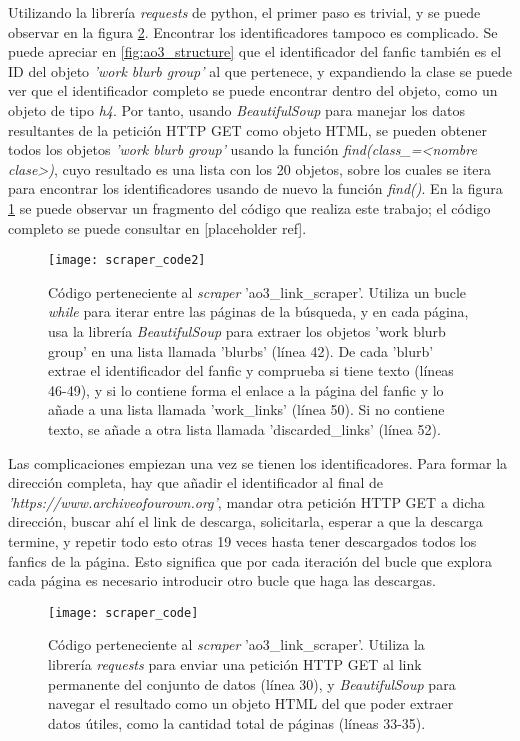 \documentclass{pre-tfg}
\newcommand{\refToLinkScraperCode}{[placeholder ref]}
\begin{document}
Utilizando la librería \textit{requests} de python, el primer paso es trivial, y se puede observar en la figura \ref{code:scraper1}. Encontrar los identificadores tampoco es complicado. Se puede apreciar en \ref{fig:ao3_structure} que el identificador del fanfic también es el ID del objeto \textit{'work blurb group'} al que pertenece, y expandiendo la clase se puede ver que el identificador completo se puede encontrar dentro del objeto, como un objeto de tipo \textit{h4}. Por tanto, usando \textit{BeautifulSoup} para manejar los datos resultantes de la petición HTTP GET como objeto HTML, se pueden obtener todos los objetos \textit{'work blurb group'} usando la función \textit{find(class\_=<nombre clase>)}, cuyo resultado es una lista con los 20 objetos, sobre los cuales se itera para encontrar los identificadores usando de nuevo la función \textit{find()}. En la figura \ref{code:scraper2} se puede observar un fragmento del código que realiza este trabajo; el código completo se puede consultar en \refToLinkScraperCode.

\begin{figure}
	\texttt{[image: scraper\_code2]}
	\caption{Código perteneciente al \textit{scraper} 'ao3\_link\_scraper'. Utiliza un bucle \textit{while} para iterar entre las páginas de la búsqueda, y en cada página, usa la librería \textit{BeautifulSoup} para extraer los objetos 'work blurb group' en una lista llamada 'blurbs' (línea 42). De cada 'blurb' extrae el identificador del fanfic y comprueba si tiene texto (líneas 46-49), y si lo contiene forma el enlace a la página del fanfic y lo añade a una lista llamada 'work\_links' (línea 50). Si no contiene texto, se añade a otra lista llamada 'discarded\_links' (línea 52).}
	\label{code:scraper2}
\end{figure}


Las complicaciones empiezan una vez se tienen los identificadores. Para formar la dirección completa, hay que añadir el identificador al final de \textit{'https://www.archiveofourown.org'}, mandar otra petición HTTP GET a dicha dirección, buscar ahí el link de descarga, solicitarla, esperar a que la descarga termine, y repetir todo esto otras 19 veces hasta tener descargados todos los fanfics de la página. Esto significa que por cada iteración del bucle que explora cada página es necesario introducir otro bucle que haga las descargas.

\begin{figure}
	\texttt{[image: scraper\_code]}
	\caption{Código perteneciente al \textit{scraper} 'ao3\_link\_scraper'. Utiliza la librería \textit{requests} para enviar una petición HTTP GET al link permanente del conjunto de datos (línea 30), y \textit{BeautifulSoup} para navegar el resultado como un objeto HTML del que poder extraer datos útiles, como la cantidad total de páginas (líneas 33-35).}
	\label{code:scraper1}
	\centering
\end{figure}
\end{document}

